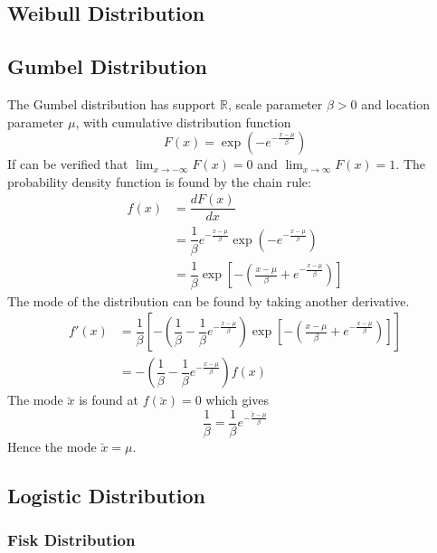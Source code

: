 \documentclass[11pt]{report} %
\begin{document}
\subsection{Weibull Distribution}

\subsection{Gumbel Distribution}

The Gumbel distribution has support $\mathbb{R}$, scale parameter $\beta > 0$ and location parameter $\mu$, with cumulative distribution function
\begin{equation}
F\left(x\right) = \exp\left(-e^{-\frac{x - \mu}{\beta}}\right)
\end{equation}
If can be verified that $\lim_{x\to -\infty}F\left(x\right) = 0$ and $\lim_{x\to \infty}F\left(x\right) = 1$. The probability density function is found by the chain rule:
\begin{align}
f\left(x\right) &= \dfrac{dF\left(x\right)}{dx} \\
&= \dfrac{1}{\beta}e^{-\frac{x - \mu}{\beta}}\exp\left(-e^{-\frac{x - \mu}{\beta}}\right) \\
&= \dfrac{1}{\beta}\exp\left[-\left(\frac{x - \mu}{\beta} + e^{-\frac{x - \mu}{\beta}}\right)\right]
\end{align}
The mode of the distribution can be found by taking another derivative.
\begin{align}
f'\left(x\right) &= \dfrac{1}{\beta}\left[-\left(\dfrac{1}{\beta} - \dfrac{1}{\beta}e^{-\frac{x - \mu}{\beta}}\right)\exp\left[-\left(\frac{x - \mu}{\beta} + e^{-\frac{x - \mu}{\beta}}\right)\right]\right] \\
&= -\left(\dfrac{1}{\beta} - \dfrac{1}{\beta}e^{-\frac{x - \mu}{\beta}}\right)f\left(x\right)
\end{align}
The mode $\breve{x}$ is found at $f\left(\breve{x}\right) = 0$ which gives
\begin{equation}
\dfrac{1}{\beta} = \dfrac{1}{\beta}e^{-\frac{\breve{x} - \mu}{\beta}}
\end{equation}
Hence the mode $\breve{x} = \mu$.

\subsection{Logistic Distribution}

\subsubsection{Fisk Distribution}
\end{document}
